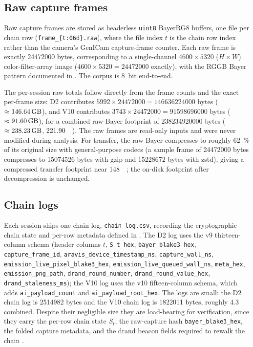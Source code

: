 \subsection{Raw capture frames}
\label{sec:availability:raw}

Raw capture frames are stored as headerless \texttt{uint8} BayerRG8 buffers, one file per chain row (\texttt{frame\_\{t:06d\}.raw}), where the file index $t$ is the chain row index rather than the camera's GenICam capture-frame counter. Each raw frame is exactly \num{24472000} bytes, corresponding to a single-channel $4600 \times 5320$ ($H \times W$) color-filter-array image ($4600 \times 5320 = \num{24472000}$ exactly), with the RGGB Bayer pattern documented in . The corpus is \SI{8}{bit} end-to-end.

The per-session raw totals follow directly from the frame counts and the exact per-frame size: D2 contributes $\num{5992} \times \num{24472000} = \num{146636224000}$ bytes ($\approx \SI{146.64}{\giga\byte}$), and V10 contributes $\num{3743} \times \num{24472000} = \num{91598696000}$ bytes ($\approx \SI{91.60}{\giga\byte}$), for a combined raw-Bayer footprint of \num{238234920000} bytes ($\approx \SI{238.23}{\giga\byte}$, \SI{221.90}{\gibi\byte}). The raw frames are read-only inputs and were never modified during analysis. For transfer, the raw Bayer compresses to roughly \SI{62}{\percent} of its original size with general-purpose codecs (a sample frame of \num{24472000} bytes compresses to \num{15074526} bytes with gzip and \num{15228672} bytes with zstd), giving a compressed transfer footprint near \SI{148}{\giga\byte}; the on-disk footprint after decompression is unchanged.

\subsection{Chain logs}
\label{sec:availability:chainlogs}

Each session ships one chain log, \texttt{chain\_log.csv}, recording the cryptographic chain state and per-row metadata defined in . The D2 log uses the v9 thirteen-column schema (header columns $t$, \texttt{S\_t\_hex}, \texttt{bayer\_blake3\_hex}, \texttt{capture\_frame\_id}, \texttt{aravis\_device\_timestamp\_ns}, \texttt{capture\_wall\_ns}, \texttt{emission\_live\_pixel\_blake3\_hex}, \texttt{emission\_live\_queued\_wall\_ns}, \texttt{meta\_hex}, \texttt{emission\_png\_path}, \texttt{drand\_round\_number}, \texttt{drand\_round\_value\_hex}, \texttt{drand\_staleness\_ms}); the V10 log uses the v10 fifteen-column schema, which adds \texttt{ai\_payload\_count} and \texttt{ai\_payload\_root\_hex}. The logs are small: the D2 chain log is \num{2514982} bytes and the V10 chain log is \num{1822011} bytes, roughly \SI{4.3}{\mega\byte} combined. Despite their negligible size they are load-bearing for verification, since they carry the per-row chain state $S_t$, the raw-capture hash \texttt{bayer\_blake3\_hex}, the folded capture metadata, and the drand beacon fields required to rewalk the chain \cite{drandbeacon}.

